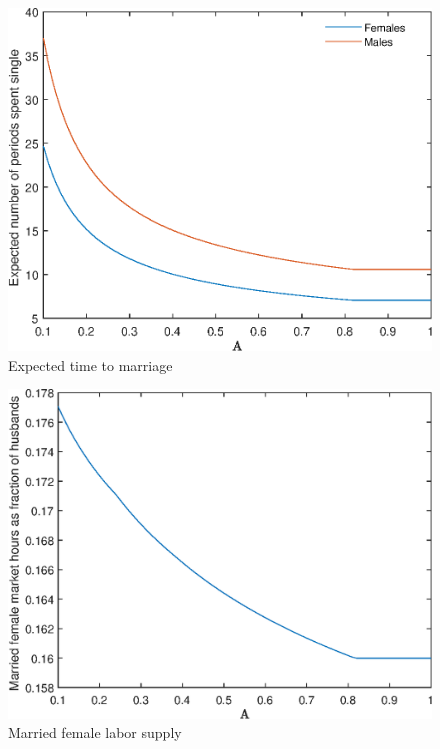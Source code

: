 \documentclass[12pt]{article}
\begin{document}
\begin{figure}
	\centering
	\caption{Expected time to marriage}
	\includegraphics{Graphs/exp_single_A_ex1.eps}
\end{figure}

\begin{figure}
	\centering
	\caption{Married female labor supply}
	\includegraphics{Graphs/lf_A_ex1.eps}
\end{figure}
\end{document}
